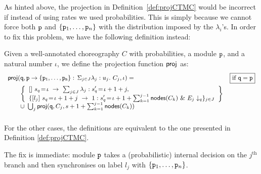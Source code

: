     As hinted above, the projection in Definition~\ref{def:projCTMC}
    would be incorrect if instead of using rates we used
    probabilities. This is simply because we cannot force both
    $\mathtt{p}$ and $\{\mathtt{p}_1,\ldots,\mathtt{p}_n\}$ with the
    distribution imposed by the $\lambda_i$'s. In order to fix this
    problem, we have the following definition instead:
    \begin{definition} Given a well-annotated
      choreography $C$ with probabilities, a module $\mathtt{p}$, and a
      natural number $\iota$, we define the projection function
      $\mathsf{proj}$ as:
      \begin{displaymath}\small
        \begin{array}{lr}

          \proj (\role q,\interact{p}{\role p_1,\ldots,\role p_n}, \iota)= 
          &  \boxed{\text{if }\role q=\role p}\\[2mm]
          \qquad
          \left\{
          \begin{array}{lll}
            \commandBase {} {s_{q}\!=\! \iota}{\ \sum_{j\in J} \lambda_j: s'_{q}\!=\! \iota+1+j},\\ 
            \{\commandBase {l_j} {s_{q}\!=\! \iota+1+j}
            \ 1: s'_{q}\!=\! \iota+1+\sum_{k=1}^{j-1}\mathsf{nodes}({C_k})\ \&\ \projE
            {E_j}q\}_{j\in J}
          \end{array}
          \right\}
          \\
          \qquad\cup\ \bigcup_{j} \proj (\role q, C_j, s+1+\sum_{k=1}^{j-1}\mathsf{nodes}({C_k}))
          \\\\

        \end{array}
      \end{displaymath}
      For the other cases, the definitions are equivalent to the one
      presented in Definition \ref{def:projCTMC}.
    \end{definition}
    The fix is immediate: module $\mathtt{p}$ takes a (probabilistic)
    internal decision on the $j^{\text{th}}$ branch and then
    synchronises on label $l_j$ with $\{\mathtt{p}_1,\ldots,\mathtt{p}_n\}$.       


